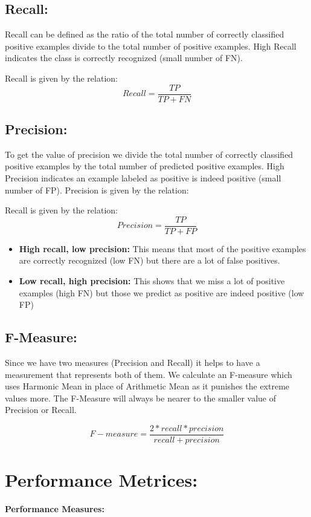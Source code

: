 \documentclass{report}
\begin{document}
\subsection{Recall: }
Recall can be defined as the ratio of the total number of correctly classified positive examples divide to the total number of positive examples. High Recall indicates the class is correctly recognized (small number of FN).

Recall is given by the relation:
\[Recall = \frac{TP}{TP + FN}\]


\subsection{Precision: }
To get the value of precision we divide the total number of correctly classified positive examples by the total number of predicted positive examples. High Precision indicates an example labeled as positive is indeed positive (small number of FP).
Precision is given by the relation:

Recall is given by the relation:
\[Precision = \frac{TP}{TP + FP}\]

\begin{itemize}

\item \textbf{High recall, low precision:}
This means that most of the positive examples are correctly recognized (low FN) but there are a lot of false positives.

\item \textbf{Low recall, high precision:}
This shows that we miss a lot of positive examples (high FN) but those we predict as positive are indeed positive (low FP)
\end{itemize}

\subsection{F-Measure: }
Since we have two measures (Precision and Recall) it helps to have a measurement that represents both of them. We calculate an F-measure which uses Harmonic Mean in place of Arithmetic Mean as it punishes the extreme values more.
The F-Measure will always be nearer to the smaller value of Precision or Recall.

\[F-measure = \frac{2 * recall * precision}{recall + precision}\]



\section{Performance Metrices: }
\textbf{Performance Measures:}
\setlength\extrarowheight{5pt}
\end{document}
